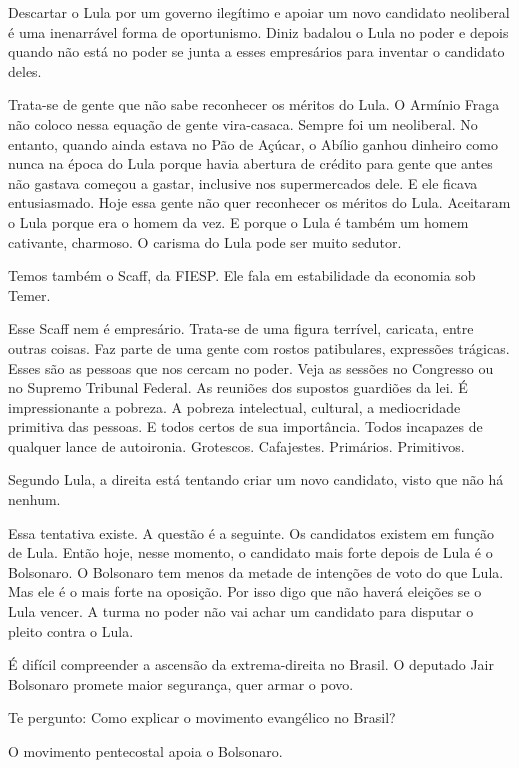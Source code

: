 \falaG Descartar o Lula por um governo ilegítimo e apoiar um novo candidato
neoliberal é uma inenarrável forma de oportunismo. Diniz badalou o Lula
no poder e depois quando não está no poder se junta a esses empresários
para inventar o candidato deles.

\falaM Trata-se de gente que não sabe reconhecer os méritos do Lula. O
Armínio Fraga não coloco nessa equação de gente vira-casaca. Sempre foi
um neoliberal. No entanto, quando ainda estava no Pão de Açúcar, o
Abílio ganhou dinheiro como nunca na época do Lula porque havia abertura
de crédito para gente que antes não gastava começou a gastar, inclusive
nos supermercados dele. E ele ficava entusiasmado. Hoje essa gente não
quer reconhecer os méritos do Lula. Aceitaram o Lula porque era o homem
da vez. E porque o Lula é também um homem cativante, charmoso. O carisma
do Lula pode ser muito sedutor.

\falaG Temos também o Scaff, da FIESP. Ele fala em estabilidade da economia
sob Temer.

\falaM Esse Scaff nem é empresário. Trata-se de uma figura terrível,
caricata, entre outras coisas. Faz parte de uma gente com rostos
patibulares, expressões trágicas. Esses são as pessoas que nos cercam no
poder. Veja as sessões no Congresso ou no Supremo Tribunal Federal. As
reuniões dos supostos guardiões da lei. É impressionante a pobreza. A
pobreza intelectual, cultural, a mediocridade primitiva das pessoas. E
todos certos de sua importância. Todos incapazes de qualquer lance de
autoironia. Grotescos. Cafajestes. Primários. Primitivos.

\falaG Segundo Lula, a direita está tentando criar um novo candidato, visto
que não há nenhum.

\falaM Essa tentativa existe. A questão é a seguinte. Os candidatos existem
em função de Lula. Então hoje, nesse momento, o candidato mais forte
depois de Lula é o Bolsonaro. O Bolsonaro tem menos da metade de
intenções de voto do que Lula. Mas ele é o mais forte na oposição. Por
isso digo que não haverá eleições se o Lula vencer. A turma no poder não
vai achar um candidato para disputar o pleito contra o Lula.

\falaG É difícil compreender a ascensão da extrema-direita no Brasil. O
deputado Jair Bolsonaro promete maior segurança, quer armar o povo.

\falaM Te pergunto: Como explicar o movimento evangélico no Brasil?

\falaG O movimento pentecostal apoia o Bolsonaro.

